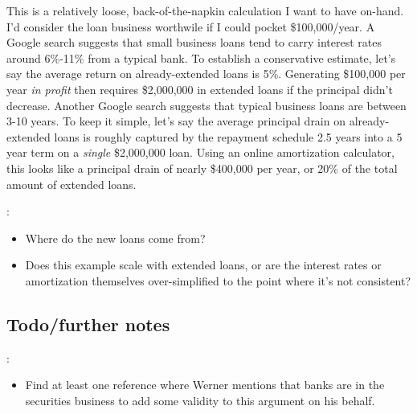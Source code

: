 This is a relatively loose, back-of-the-napkin calculation I want to have on-hand.  I'd consider the loan business worthwile if I could pocket \$100,000/year.  A Google search suggests that small business loans tend to carry interest rates around 6\%-11\% from a typical bank.  To establish a conservative estimate, let's say the average return on already-extended loans is 5\%.  Generating \$100,000 per year {\it in profit} then requires \$2,000,000 in extended loans if the principal didn't decrease.  Another Google search suggests that typical business loans are between 3-10 years.  To keep it simple, let's say the average principal drain on already-extended loans is roughly captured by the repayment schedule 2.5 years into a 5 year term on a {\it single} \$2,000,000 loan.  Using an online amortization calculator, this looks like a principal drain of nearly \$400,000 per year, or 20\% of the total amount of extended loans.

\note{[Todo]}:
\begin{itemize}
    \item Where do the new loans come from?
    \item Does this example scale with extended loans, or are the interest rates or amortization themselves over-simplified to the point where it's not consistent?
\end{itemize}


\subsection{Todo/further notes}

\note{[Todo]}:
\begin{itemize}
    \item Find at least one reference where Werner mentions that banks are in the securities business to add some validity to this argument on his behalf.
\end{itemize}